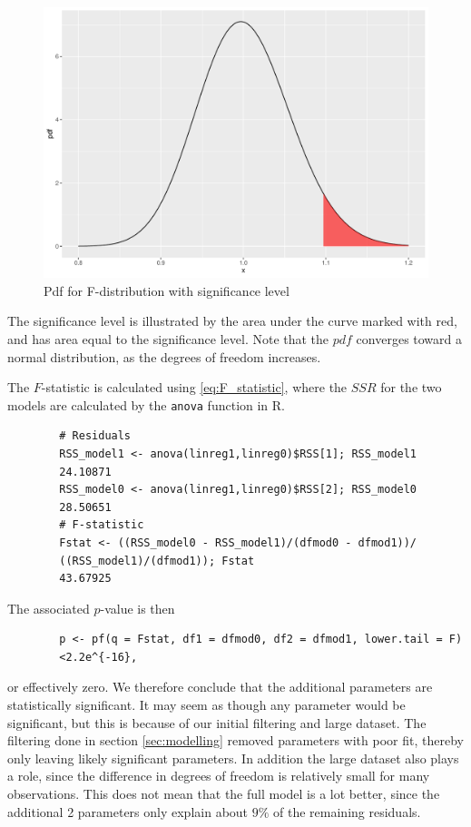     \begin{figure}[H]
        \centering
      \includegraphics[width = 0.5 \textwidth]{figures/Fdistsign.pdf}
      \caption{Pdf for F-distribution with significance level}
      \label{fig:my_label}
    \end{figure}
    
    The significance level is illustrated by the area under the curve marked with red, and has area equal to the significance level. Note that the $pdf$ converges toward a normal distribution, as the degrees of freedom increases.
    
    The $F$-statistic is calculated using \eqref{eq:F_statistic}, where the $SSR$ for the two models are calculated by the \texttt{anova} function in R. 
    \begin{lstlisting}
        # Residuals
        RSS_model1 <- anova(linreg1,linreg0)$RSS[1]; RSS_model1
        24.10871
        RSS_model0 <- anova(linreg1,linreg0)$RSS[2]; RSS_model0
        28.50651
        # F-statistic
        Fstat <- ((RSS_model0 - RSS_model1)/(dfmod0 - dfmod1))/
        ((RSS_model1)/(dfmod1)); Fstat
        43.67925
    \end{lstlisting}
    
    The associated $p$-value is then
    
    \begin{lstlisting}
        p <- pf(q = Fstat, df1 = dfmod0, df2 = dfmod1, lower.tail = F)
        <2.2e^{-16},
    \end{lstlisting}
    
    or effectively zero. We therefore conclude that the additional parameters are statistically significant.
    It may seem as though any parameter would be significant, but this is because of our initial filtering and large dataset.
    The filtering done in section \ref{sec:modelling} removed parameters with poor fit, thereby only leaving likely significant parameters.
    In addition the large dataset also plays a role, since the difference in degrees of freedom is relatively small for many observations. 
    This does not mean that the full model is a lot better, since the additional 2 parameters only explain about $9\%$ of the remaining residuals. 
    
